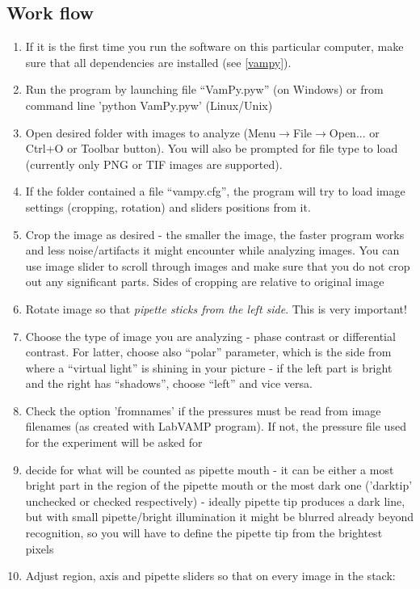 \subsection{Work flow}\label{vampy-work}
\begin{enumerate}
	\item If it is the first time you run the software on this particular computer, make sure that all dependencies are installed (see \ref{vampy}).
	\item Run the program by launching file ``VamPy.pyw'' (on Windows) or from command line 'python VamPy.pyw' (Linux/Unix)
	\item Open desired folder with images to analyze (Menu$\rightarrow$File$\rightarrow$Open... or Ctrl+O or Toolbar button). You will also be prompted for file type to load (currently only PNG or TIF images are supported).
	\item If the folder contained a file ``vampy.cfg'', the program will try to load image settings (cropping, rotation) and sliders positions from it.
	\item Crop the image as desired - the smaller the image, the faster program works and less noise/artifacts it might encounter while analyzing images. You can use image slider to scroll through images and make sure that you do not crop out any significant parts. Sides of cropping are relative to original image
	\item Rotate image so that \emph{pipette sticks from the left side}. This is very important!
	\item Choose the type of image you are analyzing - phase contrast or differential contrast. For latter, choose also ``polar'' parameter, which is the side from where a ``virtual light'' is shining in your picture - if the left part is bright and the right has ``shadows'', choose ``left'' and vice versa.
	\item Check the option 'fromnames' if the pressures must be read from image filenames (as created with LabVAMP program). If not, the pressure file used for the experiment will be asked for
	\item decide for what will be counted as pipette mouth - it can be either a most bright part in the region of the pipette mouth or the most dark one ('darktip' unchecked or checked respectively) - ideally pipette tip produces a dark line, but with small pipette/bright illumination it might be blurred already beyond recognition, so you will have to define the pipette tip from the brightest pixels
	\item Adjust region, axis and pipette sliders so that on every image in the stack:

\end{enumerate}
